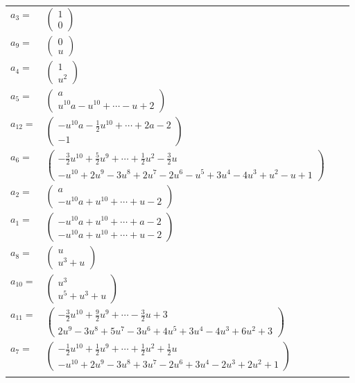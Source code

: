 \documentclass[1p]{elsarticle_modified}
\theoremstyle{definition}
\begin{document}
\begin{tabular}{m{7pt} m{180pt} m{7pt} m{180pt} }
\flushright $a_{3}=$&$\begin{pmatrix}1\\0\end{pmatrix}$ \\
\flushright $a_{9}=$&$\begin{pmatrix}0\\u\end{pmatrix}$ \\
\flushright $a_{4}=$&$\begin{pmatrix}1\\u^2\end{pmatrix}$ \\
\flushright $a_{5}=$&$\begin{pmatrix}a\\u^{10} a- u^{10}+\cdots- u+2\end{pmatrix}$ \\
\flushright $a_{12}=$&$\begin{pmatrix}- u^{10} a-\frac{1}{2} u^{10}+\cdots+2 a-2\\-1\end{pmatrix}$ \\
\flushright $a_{6}=$&$\begin{pmatrix}-\frac{3}{2} u^{10}+\frac{5}{2} u^9+\cdots+\frac{1}{2} u^2-\frac{3}{2} u\\- u^{10}+2 u^9-3 u^8+2 u^7-2 u^6- u^5+3 u^4-4 u^3+u^2- u+1\end{pmatrix}$ \\
\flushright $a_{2}=$&$\begin{pmatrix}a\\- u^{10} a+u^{10}+\cdots+u-2\end{pmatrix}$ \\
\flushright $a_{1}=$&$\begin{pmatrix}- u^{10} a+u^{10}+\cdots+a-2\\- u^{10} a+u^{10}+\cdots+u-2\end{pmatrix}$ \\
\flushright $a_{8}=$&$\begin{pmatrix}u\\u^3+u\end{pmatrix}$ \\
\flushright $a_{10}=$&$\begin{pmatrix}u^3\\u^5+u^3+u\end{pmatrix}$ \\
\flushright $a_{11}=$&$\begin{pmatrix}-\frac{3}{2} u^{10}+\frac{9}{2} u^9+\cdots-\frac{3}{2} u+3\\2 u^9-3 u^8+5 u^7-3 u^6+4 u^5+3 u^4-4 u^3+6 u^2+3\end{pmatrix}$ \\
\flushright $a_{7}=$&$\begin{pmatrix}-\frac{1}{2} u^{10}+\frac{1}{2} u^9+\cdots+\frac{1}{2} u^2+\frac{1}{2} u\\- u^{10}+2 u^9-3 u^8+3 u^7-2 u^6+3 u^4-2 u^3+2 u^2+1\end{pmatrix}$\\&\end{tabular}
\end{document}
